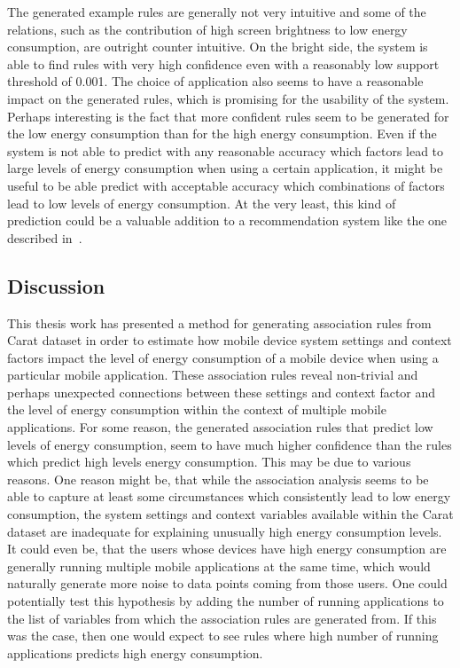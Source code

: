 The generated example rules are generally not very intuitive and some of the relations, such as the contribution of high screen brightness to low energy consumption, are outright counter intuitive. On the bright side, the system is able to find rules with very high confidence even with a reasonably low support threshold of 0.001. The choice of application also seems to have a reasonable impact on the generated rules, which is promising for the usability of the system. Perhaps interesting is the fact that more confident rules seem to be generated for the low energy consumption than for the high energy consumption. Even if the system is not able to predict with any reasonable accuracy which factors lead to large levels of energy consumption when using a certain application, it might be useful to be able predict with acceptable accuracy which combinations of factors lead to low levels of energy consumption. At the very least, this kind of prediction could be a valuable addition to a recommendation system like the one described in~\cite{PELTONEN201671}.

\subsection{Discussion}

This thesis work has presented a method for generating association rules from Carat dataset in order to estimate how mobile device system settings and context factors impact the level of energy consumption of a mobile device when using a particular mobile application. These association rules reveal non-trivial and perhaps unexpected connections between these settings and context factor and the level of energy consumption within the context of multiple mobile applications. For some reason, the generated association rules that predict low levels of energy consumption, seem to have much higher confidence than the rules which predict high levels energy consumption. This may be due to various reasons. One reason might be, that while the association analysis seems to be able to capture at least some circumstances which consistently lead to low energy consumption, the system settings and context variables available within the Carat dataset are inadequate for explaining unusually high energy consumption levels. It could even be, that the users whose devices have high energy consumption are generally running multiple mobile applications at the same time, which would naturally generate more noise to data points coming from those users. One could potentially test this hypothesis by adding the number of running applications to the list of variables from which the association rules are generated from. If this was the case, then one would expect to see rules where high number of running applications predicts high energy consumption. 

